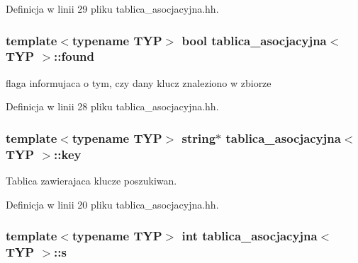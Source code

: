 Definicja w linii 29 pliku tablica\-\_\-asocjacyjna.\-hh.

\hypertarget{classtablica__asocjacyjna_aa3423d398d1a6b96e3f42398a2ce5a1e}{
\subsubsection[{found}]{\setlength{\rightskip}{0pt plus 5cm}template$<$typename T\-Y\-P$>$ bool {\bf tablica\-\_\-asocjacyjna}$<$ T\-Y\-P $>$\-::found\hspace{0.3cm}{\ttfamily [private]}}}\label{classtablica__asocjacyjna_aa3423d398d1a6b96e3f42398a2ce5a1e}


flaga informujaca o tym, czy dany klucz znaleziono w zbiorze 



Definicja w linii 28 pliku tablica\-\_\-asocjacyjna.\-hh.

\hypertarget{classtablica__asocjacyjna_aefde9ad3347d42f36cab258144bacc1f}{
\subsubsection[{key}]{\setlength{\rightskip}{0pt plus 5cm}template$<$typename T\-Y\-P$>$ string$\ast$ {\bf tablica\-\_\-asocjacyjna}$<$ T\-Y\-P $>$\-::key\hspace{0.3cm}{\ttfamily [private]}}}\label{classtablica__asocjacyjna_aefde9ad3347d42f36cab258144bacc1f}


Tablica zawierajaca klucze poszukiwan. 



Definicja w linii 20 pliku tablica\-\_\-asocjacyjna.\-hh.

\hypertarget{classtablica__asocjacyjna_a4a9d8aa0a03fd1ccf2fa7980d61bc197}{
\subsubsection[{s}]{\setlength{\rightskip}{0pt plus 5cm}template$<$typename T\-Y\-P$>$ int {\bf tablica\-\_\-asocjacyjna}$<$ T\-Y\-P $>$\-::s\hspace{0.3cm}{\ttfamily [private]}}}\label{classtablica__asocjacyjna_a4a9d8aa0a03fd1ccf2fa7980d61bc197}


